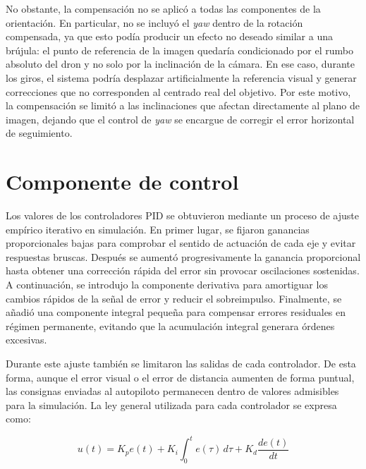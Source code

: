 \vspace{0.3cm}

No obstante, la compensación no se aplicó a todas las componentes de la orientación. En particular, no se incluyó el \textit{yaw} dentro de la rotación compensada, ya que esto podía producir un efecto no deseado similar a una brújula: el punto de referencia de la imagen quedaría condicionado por el rumbo absoluto del dron y no solo por la inclinación de la cámara. En ese caso, durante los giros, el sistema podría desplazar artificialmente la referencia visual y generar correcciones que no corresponden al centrado real del objetivo. Por este motivo, la compensación se limitó a las inclinaciones que afectan directamente al plano de imagen, dejando que el control de \textit{yaw} se encargue de corregir el error horizontal de seguimiento.

\vspace{0.3cm}

\section{Componente de control}

Los valores de los controladores PID se obtuvieron mediante un proceso de ajuste empírico iterativo en simulación. En primer lugar, se fijaron ganancias proporcionales bajas para comprobar el sentido de actuación de cada eje y evitar respuestas bruscas. Después se aumentó progresivamente la ganancia proporcional hasta obtener una corrección rápida del error sin provocar oscilaciones sostenidas. A continuación, se introdujo la componente derivativa para amortiguar los cambios rápidos de la señal de error y reducir el sobreimpulso. Finalmente, se añadió una componente integral pequeña para compensar errores residuales en régimen permanente, evitando que la acumulación integral generara órdenes excesivas.

\vspace{0.3cm}

Durante este ajuste también se limitaron las salidas de cada controlador. De esta forma, aunque el error visual o el error de distancia aumenten de forma puntual, las consignas enviadas al autopiloto permanecen dentro de valores admisibles para la simulación. La ley general utilizada para cada controlador se expresa como:

\begin{equation}
u(t) = K_p e(t) + K_i \int_0^t e(\tau)\,d\tau + K_d \frac{de(t)}{dt}
\end{equation}

